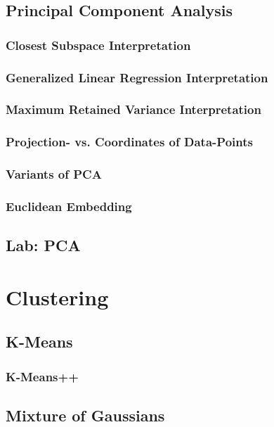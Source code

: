 \documentclass[11pt,fleqn]{book} %
\begin{document}
        \subsection{Principal Component Analysis}
            \subsubsection{Closest Subspace Interpretation}
            \subsubsection{Generalized Linear Regression Interpretation}
            \subsubsection{Maximum Retained Variance Interpretation}
            \subsubsection{Projection- vs. Coordinates of Data-Points}
            \subsubsection{Variants of PCA}
        \subsubsection{Euclidean Embedding}
        \subsection{Lab: PCA}
        
    \section{Clustering}
        \subsection{K-Means}
            \subsubsection{}
            \subsubsection{K-Means++}
        \subsection{Mixture of Gaussians}
\end{document}
